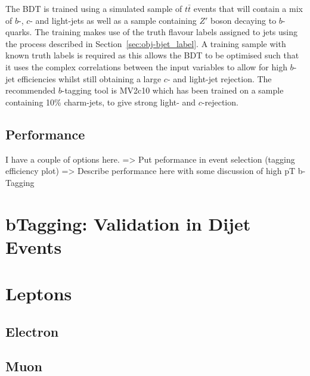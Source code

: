 The BDT is trained using a simulated sample of $t\bar{t}$ events that will contain a mix of  $b$-, $c$- and light-jets
as well as a sample containing $Z'$ boson decaying to $b$-quarks.
The training makes use of the truth flavour labels assigned to jets using the process described in Section~\ref{sec:obj-bjet_label}.
A training sample with known truth labels is required as this allows the BDT to be optimised
such that it uses the complex correlations between the input variables to allow for high $b$-jet efficiencies
whilst still obtaining a large $c$- and light-jet rejection.
The recommended $b$-tagging tool is MV2c10 which has been trained on a sample containing 10\% charm-jets, to give strong light- and $c$-rejection.

\subsection{Performance}

I have a couple of options here.
=> Put peformance in event selection (tagging efficiency plot)
=> Describe performance here with some discussion of high pT b-Tagging

\section{bTagging: Validation in Dijet Events}

\section{Leptons}   
\subsection{Electron}
\label{sec:obj-electron}
\subsection{Muon}
\label{sec:obj-muon}

